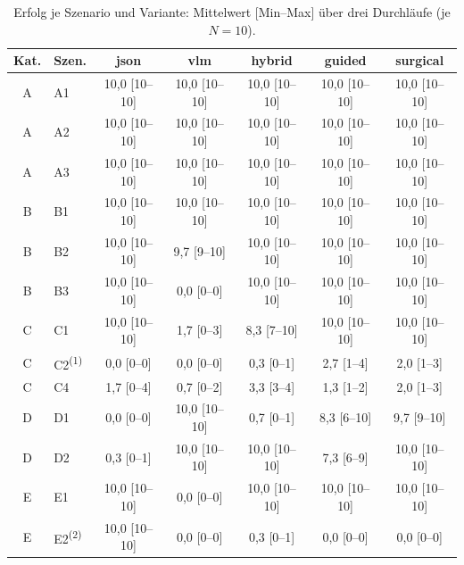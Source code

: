 \begin{table}[ht]
  \centering
  \caption{Erfolg je Szenario und Variante: Mittelwert [Min--Max] über drei
           Durchläufe (je $N=10$).}
  \label{tab:results-scenario}
  \footnotesize
  \setlength{\tabcolsep}{4pt}
  \begin{tabular}{c l ccccc}
    \toprule
    Kat. & Szen. & json & vlm & hybrid & guided & surgical \\
    \midrule
    A & A1 & 10{,}0 [10--10] & 10{,}0 [10--10] & 10{,}0 [10--10] & 10{,}0 [10--10] & 10{,}0 [10--10] \\
    A & A2 & 10{,}0 [10--10] & 10{,}0 [10--10] & 10{,}0 [10--10] & 10{,}0 [10--10] & 10{,}0 [10--10] \\
    A & A3 & 10{,}0 [10--10] & 10{,}0 [10--10] & 10{,}0 [10--10] & 10{,}0 [10--10] & 10{,}0 [10--10] \\
    B & B1 & 10{,}0 [10--10] & 10{,}0 [10--10] & 10{,}0 [10--10] & 10{,}0 [10--10] & 10{,}0 [10--10] \\
    B & B2 & 10{,}0 [10--10] &  9{,}7 [9--10]  & 10{,}0 [10--10] & 10{,}0 [10--10] & 10{,}0 [10--10] \\
    B & B3 & 10{,}0 [10--10] &  0{,}0 [0--0]   & 10{,}0 [10--10] & 10{,}0 [10--10] & 10{,}0 [10--10] \\
    C & C1 & 10{,}0 [10--10] &  1{,}7 [0--3]   &  8{,}3 [7--10]  & 10{,}0 [10--10] & 10{,}0 [10--10] \\
    C & C2\textsuperscript{(1)} & 0{,}0 [0--0] & 0{,}0 [0--0] & 0{,}3 [0--1] & 2{,}7 [1--4] & 2{,}0 [1--3] \\
    C & C4 &  1{,}7 [0--4]  &  0{,}7 [0--2]   &  3{,}3 [3--4]   &  1{,}3 [1--2]  &  2{,}0 [1--3]  \\
    D & D1 &  0{,}0 [0--0]  & 10{,}0 [10--10] &  0{,}7 [0--1]   &  8{,}3 [6--10] &  9{,}7 [9--10] \\
    D & D2 &  0{,}3 [0--1]  & 10{,}0 [10--10] & 10{,}0 [10--10] &  7{,}3 [6--9]  & 10{,}0 [10--10] \\
    E & E1 & 10{,}0 [10--10] &  0{,}0 [0--0]   & 10{,}0 [10--10] & 10{,}0 [10--10] & 10{,}0 [10--10] \\
    E & E2\textsuperscript{(2)} & 10{,}0 [10--10] & 0{,}0 [0--0] & 0{,}3 [0--1] & 0{,}0 [0--0] & 0{,}0 [0--0] \\
    \bottomrule
  \end{tabular}


\end{table}
